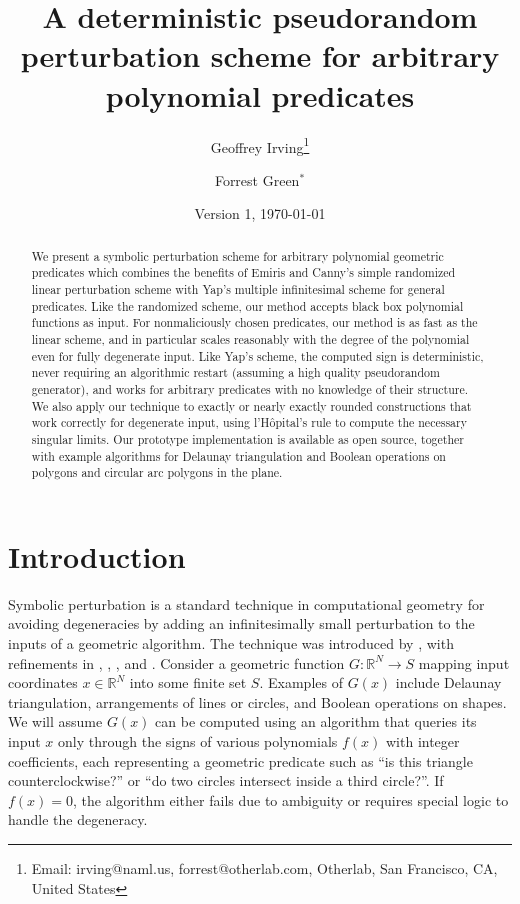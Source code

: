 \documentclass[11pt]{article}
\title{A deterministic pseudorandom perturbation scheme for arbitrary polynomial predicates}
\author{Geoffrey Irving\thanks{Email: irving@naml.us, forrest@otherlab.com, Otherlab, San Francisco, CA, United States}
\and Forrest Green$^*$}
\date{Version 1, \today}
\newcommand{\R}{\mathbb{R}}
\begin{document}
\maketitle

\begin{abstract}
We present a symbolic perturbation scheme for arbitrary polynomial geometric predicates which combines the benefits of
Emiris and Canny's simple randomized linear perturbation scheme with Yap's multiple infinitesimal scheme for general predicates.
Like the randomized scheme, our method accepts black box polynomial functions as input.  For nonmaliciously chosen predicates,
our method is as fast as the linear scheme, and in particular scales reasonably with the degree of the polynomial even for fully
degenerate input.  Like Yap's scheme, the computed sign is deterministic, never requiring an algorithmic restart (assuming a
high quality pseudorandom generator), and works for arbitrary predicates with no knowledge of their structure.  We also apply
our technique to exactly or nearly exactly rounded constructions that work correctly for degenerate input, using l'H\^opital's
rule to compute the necessary singular limits.  Our prototype implementation is available as open source, together with example
algorithms for Delaunay triangulation and Boolean operations on polygons and circular arc polygons in the plane.
\end{abstract}

\section{Introduction}

Symbolic perturbation is a standard technique in computational geometry for avoiding degeneracies by
adding an infinitesimally small perturbation to the inputs of a geometric algorithm.  The technique was introduced by
\cite{edelsbrunner1990simulation}, with refinements in \cite{yap1990symbolic}, \cite{emiris1992efficient}, \cite{emiris1995general},
and \cite{seidel1998nature}.  Consider a geometric function $G : \R^N \to S$ mapping input coordinates $x \in \R^N$ into
some finite set $S$.  Examples of $G(x)$ include Delaunay triangulation, arrangements of lines or circles, and Boolean operations
on shapes.  We will assume $G(x)$ can be computed using an algorithm that queries its input $x$ only through the
signs of various polynomials $f(x)$ with integer coefficients, each representing a geometric predicate such as
``is this triangle counterclockwise?'' or ``do two circles intersect inside a third circle?''.  If $f(x) = 0$, the algorithm
either fails due to ambiguity or requires special logic to handle the degeneracy.
\end{document}
